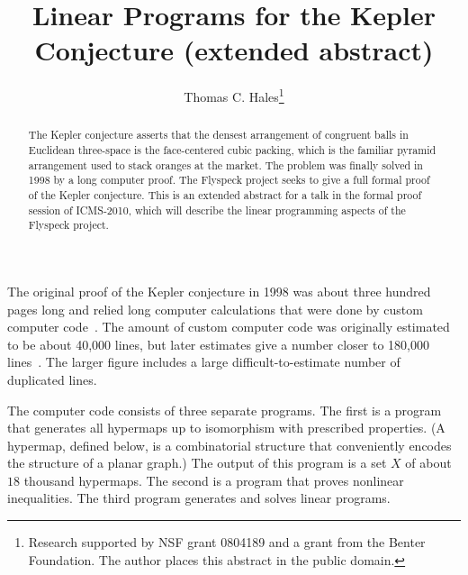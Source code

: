 \documentclass{llncs}
\begin{document}
\mainmatter
\title{Linear Programs for the Kepler Conjecture (extended abstract)}
\author{Thomas C. Hales\thanks{Research supported by NSF grant 
0804189 and a grant from the Benter Foundation.  
The author places this abstract in the
public domain.}}
%
%
\maketitle





\begin{abstract} 
  The Kepler conjecture asserts that the densest arrangement of
  congruent balls in Euclidean three-space is the face-centered cubic packing, which is the
  familiar pyramid arrangement used to stack oranges at the market.
  The problem was finally solved in 1998 by a long computer proof.
  The Flyspeck project seeks to give a full formal proof of the Kepler
  conjecture.  This is an extended abstract for a talk in the formal proof session of ICMS-2010, which  will
  describe the linear programming aspects of the Flyspeck project.
\end{abstract}


\def\tikzfig#1#2#3{%
\begin{figure}[htb]%
  \centering
\begin{tikzpicture}#3
\end{tikzpicture}
  \caption{#2}
  \label{fig:#1}%
\end{figure}%
}
\def\op#1{{\operatorname{#1}}}
\newcommand{\ring}[1]{\mathbb{#1}}

The original proof of the Kepler conjecture in 1998 was about three
hundred pages long and relied long computer calculations that were
done by custom computer code~\cite{Hales:2006:DCG}.  The amount of custom computer code was
originally estimated to be about 40,000 lines, but later estimates
give a number closer to 180,000 lines~\cite{HHMNOZ}.  The larger figure includes a
large difficult-to-estimate number of duplicated lines.

The computer code consists of three separate
programs.  The first is a program that generates
all hypermaps up to isomorphism with prescribed
properties.  (A hypermap, defined below, is a combinatorial structure that 
conveniently encodes the structure of a planar graph.)  The output of this program
is a set $X$ of about $18$ thousand hypermaps.
The second is a program that proves nonlinear 
inequalities.  The third program generates and
solves linear programs.  
\end{document}
